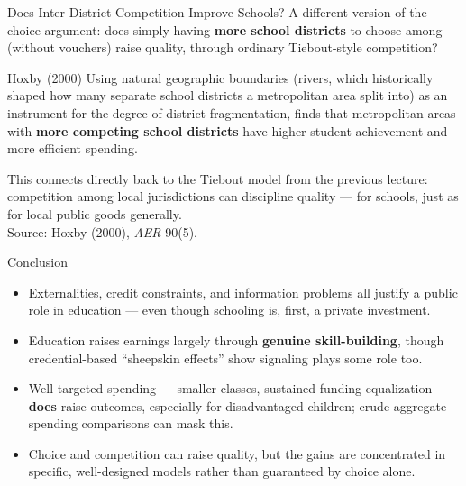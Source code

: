 \documentclass[11pt,aspectratio=169]{beamer}
\newcommand{\srcnote}[1]{{\footnotesize\color{wugray}Source: #1}}
\begin{document}
\begin{frame}{Does Inter-District Competition Improve Schools?}
  A different version of the choice argument: does simply having \textbf{more school districts} to choose among (without vouchers) raise quality, through ordinary Tiebout-style competition?
  \begin{block}{Hoxby (2000)}
    Using natural geographic boundaries (rivers, which historically shaped how many separate school districts a metropolitan area split into) as an instrument for the degree of district fragmentation, finds that metropolitan areas with \textbf{more competing school districts} have higher student achievement and more efficient spending.
  \end{block}
  \small This connects directly back to the Tiebout model from the previous lecture: competition among local jurisdictions can discipline quality --- for schools, just as for local public goods generally.\\
  \srcnote{Hoxby (2000), \emph{AER} 90(5).}
\end{frame}

\begin{frame}{Conclusion}
  \begin{itemize}
    \item Externalities, credit constraints, and information problems all justify a public role in education --- even though schooling is, first, a private investment.
    \item Education raises earnings largely through \textbf{genuine skill-building}, though credential-based ``sheepskin effects'' show signaling plays some role too.
    \item Well-targeted spending --- smaller classes, sustained funding equalization --- \textbf{does} raise outcomes, especially for disadvantaged children; crude aggregate spending comparisons can mask this.
    \item Choice and competition can raise quality, but the gains are concentrated in specific, well-designed models rather than guaranteed by choice alone.
  \end{itemize}
\end{frame}
\end{document}
